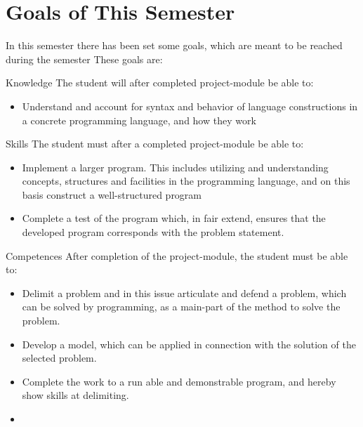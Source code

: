 \section{Goals of This Semester}
In this semester there has been set some goals, which are meant to be reached during the semester These goals are: 

Knowledge
	The student will after completed project-module be able to:
	\begin{itemize}
			\item Understand and account for syntax and behavior of language constructions in a concrete programming language, and how they work
	\end{itemize}

		
Skills
	The student must after a completed project-module be able to:
	\begin{itemize}
		\item Implement a larger program. This includes utilizing and understanding concepts, structures and facilities in the programming language, and on this basis construct a well-structured program
		\item Complete a test of the program which, in fair extend, ensures that the developed program corresponds with the problem statement. 
	\end{itemize}

Competences
	After completion of the project-module, the student must be able to:
	\begin{itemize}
		\item Delimit a problem and in this issue articulate and defend a problem, which can be solved by programming, as a main-part of the method to solve the problem.
		
		\item Develop a model, which can be applied in connection with  the solution of the selected problem. 
		\item Complete the work to a run able and demonstrable program, and hereby show skills at delimiting. 
		\item
		
	\end{itemize}